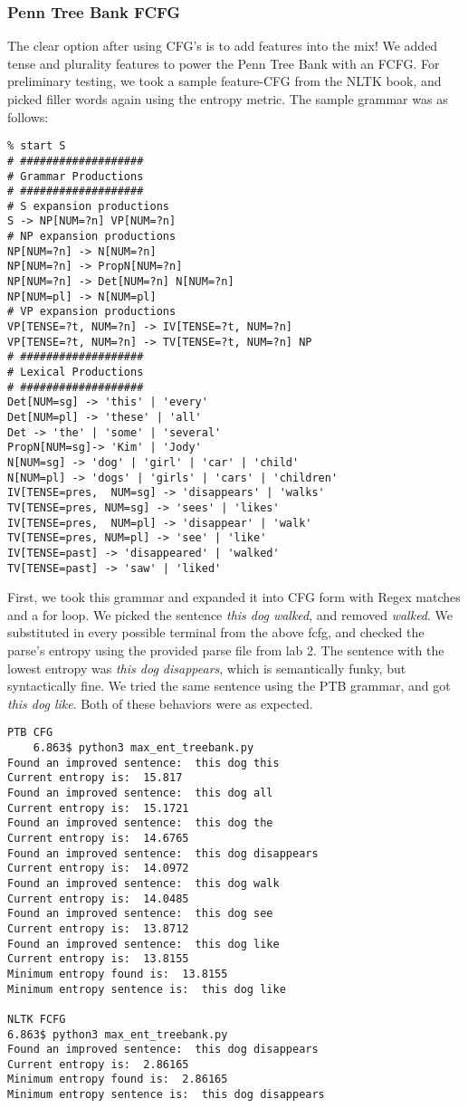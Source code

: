 \documentclass{article}[12pt]
\theoremstyle{definition}
\begin{document}
\subsubsection{Penn Tree Bank FCFG}

    The clear option after using CFG’s is to add features into the mix! We added tense and plurality features to power the Penn Tree Bank with an FCFG. For preliminary testing, we took a sample feature-CFG from the NLTK book, and picked filler words again using the entropy metric. The sample grammar was as follows:

\begin{verbatim}
% start S
# ###################
# Grammar Productions
# ###################
# S expansion productions
S -> NP[NUM=?n] VP[NUM=?n]
# NP expansion productions
NP[NUM=?n] -> N[NUM=?n]
NP[NUM=?n] -> PropN[NUM=?n]
NP[NUM=?n] -> Det[NUM=?n] N[NUM=?n]
NP[NUM=pl] -> N[NUM=pl]
# VP expansion productions
VP[TENSE=?t, NUM=?n] -> IV[TENSE=?t, NUM=?n]
VP[TENSE=?t, NUM=?n] -> TV[TENSE=?t, NUM=?n] NP
# ###################
# Lexical Productions
# ###################
Det[NUM=sg] -> 'this' | 'every'
Det[NUM=pl] -> 'these' | 'all'
Det -> 'the' | 'some' | 'several'
PropN[NUM=sg]-> 'Kim' | 'Jody'
N[NUM=sg] -> 'dog' | 'girl' | 'car' | 'child'
N[NUM=pl] -> 'dogs' | 'girls' | 'cars' | 'children'
IV[TENSE=pres,  NUM=sg] -> 'disappears' | 'walks'
TV[TENSE=pres, NUM=sg] -> 'sees' | 'likes'
IV[TENSE=pres,  NUM=pl] -> 'disappear' | 'walk'
TV[TENSE=pres, NUM=pl] -> 'see' | 'like'
IV[TENSE=past] -> 'disappeared' | 'walked'
TV[TENSE=past] -> 'saw' | 'liked'
\end{verbatim}

    First, we took this grammar and expanded it into CFG form with Regex matches and a for loop. 
We picked the sentence \emph{this dog walked}, and removed \emph{walked}. We substituted in every possible terminal from the above fcfg, and checked the parse’s entropy using the provided parse file from lab 2. The sentence with the lowest entropy was \emph{this dog disappears}, which is semantically funky, but syntactically fine. We tried the same sentence using the PTB grammar, and got \emph{this dog like}. Both of these behaviors were as expected. \newline

\begin{verbatim}
PTB CFG
    6.863$ python3 max_ent_treebank.py 
Found an improved sentence:  this dog this
Current entropy is:  15.817
Found an improved sentence:  this dog all
Current entropy is:  15.1721
Found an improved sentence:  this dog the
Current entropy is:  14.6765
Found an improved sentence:  this dog disappears
Current entropy is:  14.0972
Found an improved sentence:  this dog walk
Current entropy is:  14.0485
Found an improved sentence:  this dog see
Current entropy is:  13.8712
Found an improved sentence:  this dog like
Current entropy is:  13.8155
Minimum entropy found is:  13.8155
Minimum entropy sentence is:  this dog like

NLTK FCFG
6.863$ python3 max_ent_treebank.py 
Found an improved sentence:  this dog disappears
Current entropy is:  2.86165
Minimum entropy found is:  2.86165
Minimum entropy sentence is:  this dog disappears
\end{verbatim}
\end{document}
